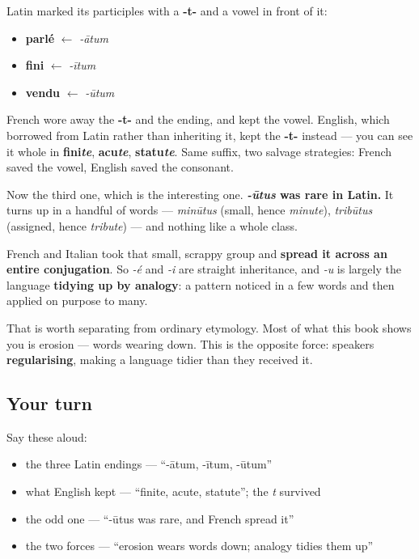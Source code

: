 \begin{cousinweb}
Latin marked its participles with a \textbf{-t-} and a vowel in front of it:

\begin{itemize}
\raggedright
  \item \textbf{parlé} $\leftarrow$ \emph{-ātum}
  \item \textbf{fini} $\leftarrow$ \emph{-ītum}
  \item \textbf{vendu} $\leftarrow$ \emph{-ūtum}
\end{itemize}

French wore away the \textbf{-t-} and the ending, and kept the vowel. English, which borrowed from Latin rather than inheriting it, kept the \textbf{-t-} instead — you can see it whole in \textbf{fini\emph{te}}, \textbf{acu\emph{te}}, \textbf{statu\emph{te}}. Same suffix, two salvage strategies: French saved the vowel, English saved the consonant.

Now the third one, which is the interesting one. \textbf{\emph{-ūtus} was rare in Latin.} It turns up in a handful of words — \emph{minūtus} (small, hence \emph{minute}), \emph{tribūtus} (assigned, hence \emph{tribute}) — and nothing like a whole class.

French and Italian took that small, scrappy group and \textbf{spread it across an entire conjugation}. So \emph{-é} and \emph{-i} are straight inheritance, and \emph{-u} is largely the language \textbf{tidying up by analogy}: a pattern noticed in a few words and then applied on purpose to many.

That is worth separating from ordinary etymology. Most of what this book shows you is erosion — words wearing down. This is the opposite force: speakers \textbf{regularising}, making a language tidier than they received it.
\end{cousinweb}

\subsection*{Your turn}
Say these aloud:

\begin{itemize}
\raggedright
  \item the three Latin endings — \textquotedblleft{}-ātum, -ītum, -ūtum\textquotedblright{}
  \item what English kept — \textquotedblleft{}finite, acute, statute\textquotedblright{}; the \emph{t} survived
  \item the odd one — \textquotedblleft{}-ūtus was rare, and French spread it\textquotedblright{}
  \item the two forces — \textquotedblleft{}erosion wears words down; analogy tidies them up\textquotedblright{}
\end{itemize}

